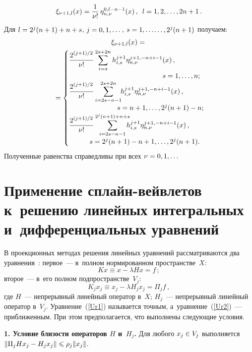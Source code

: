 \begin{multicols}{2}
\columnbreak

\noindent
$$
{\xi}_{\nu+1,l}(x)=\displaystyle\frac{\displaystyle 1\mathstrut}{\displaystyle \nu !\mathstrut}\, \eta_{n,\nu}^{0,l-n-1}(x)\,,\enskip
l=1,2,\dots, 2n+1\,.
$$
Для $l=2^j(n+1)\hm+n\hm+s$, $j\hm=0,1,\dots$, $s\hm=1,\ldots$\linebreak$\ldots,2^{j}(n\hm+1)$ получаем:
\begin{multline*}
{\xi}_{\nu+1,l}(x)={}\\
{}=
\begin{cases}
\fr{2^{({j+1})/{2}}}{\nu !}\sum\limits_{i=s}^{2s+2n}
h_{i,s}^{j+1}\eta_{n,\nu}^{j+1,-n+i-1}(x)\,, &\\
& \hspace*{-17mm}s=1,\ldots,n; \\
\fr{2^{({j+1})/{2}}}{\nu !}\sum\limits_{i=2s-n-1}^{2s+2n}
\!\! h_{i,s}^{j+1}\eta_{n,\nu}^{j+1,-n+i-1}(x)\,, &\\
& \hspace*{-40mm}s=n+1,\ldots,2^{j}(n+1)-n;\\
\fr{2^{({j+1})/{2}}}{\nu !}\sum\limits_{i=2s-n-1}^{2^{j}(n+1)+n+s}\!\!\!\!
h_{i,s}^{j+1}\eta_{n,\nu}^{j+1,-n+i-1}(x)\,, &\\
& \hspace*{-54mm}s=2^{j}(n+1)-n+1,\ldots,2^{j}(n+1).
\end{cases}
\end{multline*}
Полученные равенства справедливы при всех $\nu \hm= 0,1,\dots$

\section{Применение сплайн-вейвлетов к~решению 
линейных интегральных и~дифференциальных уравнений}

В проекционных методах решения линейных уравнений рассматриваются два 
уравнения~\cite{Akilov}: 
первое~--- в~полном нормированном пространстве~$X$:
\begin{equation}
\label{Ur1}
Kx\equiv x-\lambda Hx=f\,;
\end{equation}
второе~--- в~его полном подпространстве~$V_j$:
\begin{equation}
\label{Ur2}
K_j x_j\equiv x_j-\lambda H_j x_j=\Pi_j f\,,
\end{equation}
где $H$~--- непрерывный линейный оператор в~$X$; $H_j$~--- 
непрерывный линейный оператор в~$V_j$. Уравнение~(\ref{Ur1}) называется точным, 
а~уравнение~(\ref{Ur2})~--- приближенным. При этом предполагается, что 
выполнены следующие условия.

\noindent \textbf{1. Условие близости операторов $H$ и~$H_j$.} 
Для любого $x_j\hm\in V_j$ выполняется $\|\Pi_j H x_j \hm- H_j x_j\|
\hm\leqslant \rho_j \|x_j\|$.


\end{multicols}
